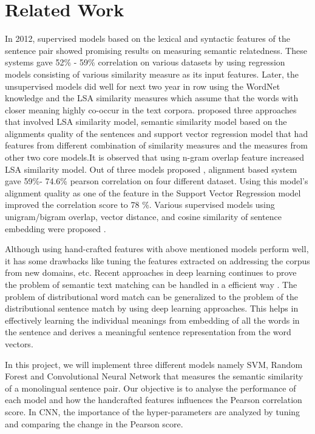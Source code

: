 \documentclass{article} %
\begin{document}
\section{Related Work}
	In 2012, supervised models based on the lexical and syntactic features of the sentence pair showed promising results on measuring semantic relatedness. These systems gave 52\% - 59\% correlation on various datasets by using regression models consisting of various similarity measure as its input features. Later, the unsupervised models did well for next two year in row using the WordNet knowledge and the LSA similarity measures which assume that the words with closer meaning highly co-occur in the text corpora. \cite{Align-Han2013} proposed three approaches that involved LSA similarity model, semantic similarity model based on the alignments quality of the sentences and support vector regression model that had features from different combination of similarity measures and the measures from other two core models.It is observed that using n-gram overlap feature increased LSA similarity model. Out of three models proposed \cite{Align-Han2013}, alignment based system  gave 59\%- 74.6\% pearson correlation on four different dataset. Using this model's alignment quality as one of the feature in the Support Vector Regression model improved the correlation score to 78 \%.  Various supervised models using unigram/bigram overlap, vector distance, and cosine similarity of sentence embedding were proposed \cite{sem-eval2105}. 
	
	Although using hand-crafted features with above mentioned models perform well, it has some drawbacks like tuning the features extracted on addressing the corpus from new domains, etc. Recent approaches in deep learning continues to prove the problem of semantic text matching can be  handled in a efficient way \cite{CNN, CNN-rank}. The problem of distributional word match can be generalized to the problem of the distributional sentence match by using deep learning approaches. This helps in effectively learning the individual meanings from embedding of all the words in the sentence and derives a meaningful sentence representation from the word vectors.
	
	In this project, we will implement three different models namely SVM, Random Forest and Convolutional Neural Network that measures the semantic similarity of a monolingual sentence pair. Our objective is to analyse the performance of each model and how the handcrafted features influences the Pearson correlation score. In CNN, the importance of the hyper-parameters are analyzed by tuning and comparing the change in the Pearson score.
\end{document}
